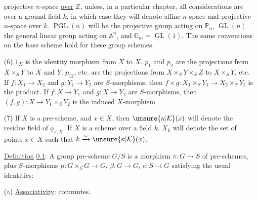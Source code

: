 
projective $n$-space \uline{over} $\underline{\mathbb Z}$, unless, in a particular chapter, all considerations are over a ground field $k$, in which case they will denote affine $n$-space and projective $n$-space over $k$. $\operatorname{PGL}(n)$ will be the projective group acting on $\mathbb P_n$, $\operatorname{GL}(n)$ the general linear group acting on $\mathbb A^n$, and $\mathbb G_m=\operatorname{GL}(1)$. The same conventions on the base scheme hold for these group schemes.

(6) $1_X$ is the identity morphism from $X$ to $X$. $p_1$ and $p_2$ are the projections from $X\times_S Y$ to $X$ and $Y$; $p_{12}$, etc. are the projections from $X\times_S Y\times_S Z$ to $X\times_S Y$, etc. If $f:X_1\longrightarrow X_2$ and $g:Y_1\longrightarrow Y_2$ are $S$-morphisms, then $f\times g:X_1\times_S Y_1\longrightarrow X_2\times_S Y_2$ is the product. If $f:X\longrightarrow Y_1$ and $g:X\longrightarrow Y_2$ are $S$-morphisms, then $(f,g):X\longrightarrow Y_1\times_S Y_2$ is the induced $X$-morphism.

(7) If $X$ is a pre-scheme, and $x\in X$, then $\unsure{\kappa|\mathcal K}(x)$ will denote the residue field of $\underline o_{x,X}$. If $X$ is a scheme over a field $k$, $X_k$ will denote the set of points $x\in X$ such that $k\xrightarrow{\sim}\unsure{\kappa|\mathcal K}(x)$.


 \uline{Definition} \uline{0.1}: A group pre-scheme $G/S$ is a morphism $\pi:G\longrightarrow S$ of pre-schemes, plus $S$-morphisms $\mu:G\times_S G\longrightarrow G$, $\beta:G\longrightarrow G$, $e:S\longrightarrow G$ satisfying the usual identities:

(a) \uline{Associativity}:
 commutes.

